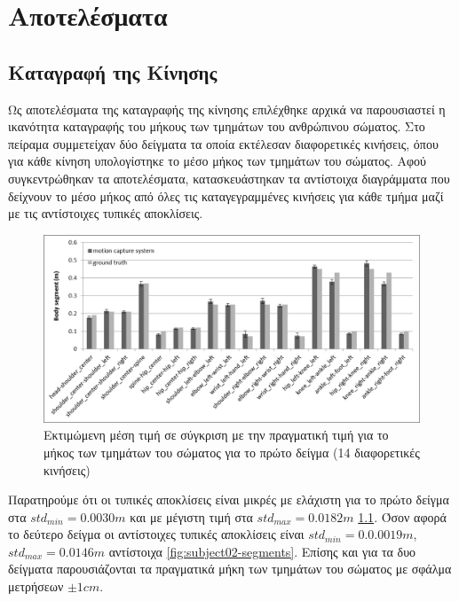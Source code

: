 \chapter{Αποτελέσματα}

\section{Καταγραφή της Κίνησης}

Ως αποτελέσματα της καταγραφής της κίνησης επιλέχθηκε αρχικά να παρουσιαστεί η ικανότητα καταγραφής του μήκους των τμημάτων του ανθρώπινου σώματος. Στο πείραμα συμμετείχαν δύο δείγματα τα οποία εκτέλεσαν διαφορετικές κινήσεις, όπου για κάθε κίνηση υπολογίστηκε το μέσο μήκος των τμημάτων του σώματος. Αφού συγκεντρώθηκαν τα αποτελέσματα, κατασκευάστηκαν τα αντίστοιχα διαγράμματα που δείχνουν το μέσο μήκος από όλες τις καταγεγραμμένες κινήσεις για κάθε τμήμα μαζί με τις αντίστοιχες τυπικές αποκλίσεις.

\begin{figure}[H]
    \centering
    \includegraphics[width=.8\textwidth]{fig/subject01-segments.png}
    \caption{Εκτιμώμενη μέση τιμή σε σύγκριση με την πραγματική τιμή για το μήκος των τμημάτων του σώματος για το πρώτο δείγμα (14 διαφορετικές κινήσεις)}
    \label{fig:subject01-segments}
\end{figure}

Παρατηρούμε ότι οι τυπικές αποκλίσεις είναι μικρές με ελάχιστη για το πρώτο δείγμα στα $std_{min} = 0.0030m$ και με μέγιστη τιμή στα $std_{max} = 0.0182m$ \ref{fig:subject01-segments}. Όσον αφορά το δεύτερο δείγμα οι αντίστοιχες τυπικές αποκλίσεις είναι $std_{min} = 0.0.0019m$, $std_{max} = 0.0146m$ αντίστοιχα \ref{fig:subject02-segments}. Επίσης και για τα δυο δείγματα παρουσιάζονται τα πραγματικά μήκη των τμημάτων του σώματος με σφάλμα μετρήσεων $\pm 1cm$.

